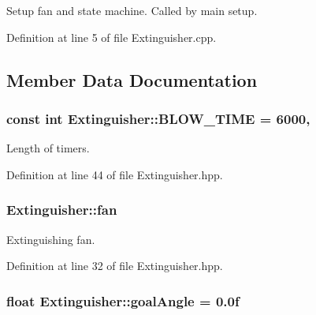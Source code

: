 Setup fan and state machine. Called by main setup. 



Definition at line 5 of file Extinguisher.\-cpp.



\subsection{Member Data Documentation}
\hypertarget{classExtinguisher_a454a63d5013db7cec4e5ae18fbfe64fa}{
\subsubsection[{B\-L\-O\-W\-\_\-\-T\-I\-M\-E}]{\setlength{\rightskip}{0pt plus 5cm}const int Extinguisher\-::\-B\-L\-O\-W\-\_\-\-T\-I\-M\-E = 6000\hspace{0.3cm}{\ttfamily [static]}, {\ttfamily [private]}}}\label{classExtinguisher_a454a63d5013db7cec4e5ae18fbfe64fa}


Length of timers. 



Definition at line 44 of file Extinguisher.\-hpp.

\hypertarget{classExtinguisher_a47ec6f79ddc26b18bbc1a0ac9741ae24}{
\subsubsection[{fan}]{ Extinguisher\-::fan\hspace{0.3cm}{\ttfamily [private]}}}\label{classExtinguisher_a47ec6f79ddc26b18bbc1a0ac9741ae24}


Extinguishing fan. 



Definition at line 32 of file Extinguisher.\-hpp.

\hypertarget{classExtinguisher_af7b156761cc23a5bee07f3cecd50213a}{
\subsubsection[{goal\-Angle}]{\setlength{\rightskip}{0pt plus 5cm}float Extinguisher\-::goal\-Angle = 0.\-0f\hspace{0.3cm}{\ttfamily [private]}}}\label{classExtinguisher_af7b156761cc23a5bee07f3cecd50213a}


